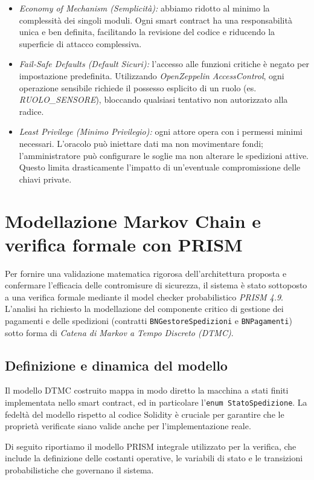 \begin{itemize}
    \item \textit{Economy of Mechanism (Semplicità):} abbiamo ridotto al minimo la complessità dei singoli moduli. Ogni smart contract ha una responsabilità unica e ben definita, facilitando la revisione del codice e riducendo la superficie di attacco complessiva.
    \item \textit{Fail-Safe Defaults (Default Sicuri):} l'accesso alle funzioni critiche è negato per impostazione predefinita. Utilizzando \textit{OpenZeppelin AccessControl}, ogni operazione sensibile richiede il possesso esplicito di un ruolo (es. \textit{RUOLO\_SENSORE}), bloccando qualsiasi tentativo non autorizzato alla radice.
    \item \textit{Least Privilege (Minimo Privilegio):} ogni attore opera con i permessi minimi necessari. L'oracolo può iniettare dati ma non movimentare fondi; l'amministratore può configurare le soglie ma non alterare le spedizioni attive. Questo limita drasticamente l'impatto di un'eventuale compromissione delle chiavi private.
\end{itemize}

\section{Modellazione Markov Chain e verifica formale con PRISM}

Per fornire una validazione matematica rigorosa dell'architettura proposta e confermare l'efficacia delle contromisure di sicurezza, il sistema è stato sottoposto a una verifica formale mediante il model checker probabilistico \textit{PRISM 4.9}. L'analisi ha richiesto la modellazione del componente critico di gestione dei pagamenti e delle spedizioni (contratti \texttt{BNGestoreSpedizioni} e \texttt{BNPagamenti}) sotto forma di \textit{Catena di Markov a Tempo Discreto (DTMC)}.

\subsection{Definizione e dinamica del modello}
Il modello DTMC costruito mappa in modo diretto la macchina a stati finiti implementata nello smart contract, ed in particolare l'\texttt{enum StatoSpedizione}. La fedeltà del modello rispetto al codice Solidity è cruciale per garantire che le proprietà verificate siano valide anche per l'implementazione reale.

Di seguito riportiamo il modello PRISM integrale utilizzato per la verifica, che include la definizione delle costanti operative, le variabili di stato e le transizioni probabilistiche che governano il sistema.

